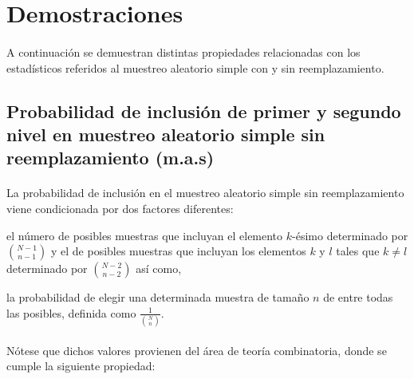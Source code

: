 \documentclass{article}
\begin{document}
	\maketitle
  \thispagestyle{empty}


  \section{Demostraciones}

    \paragraph{}
    A continuación se demuestran distintas propiedades relacionadas con los estadísticos referidos al muestreo aleatorio simple con y sin reemplazamiento.

    \subsection{Probabilidad de inclusión de primer y segundo nivel en muestreo aleatorio simple sin reemplazamiento (m.a.s)}

      \paragraph{}
      La probabilidad de inclusión en el muestreo aleatorio simple sin reemplazamiento viene condicionada por dos factores diferentes: \begin{enumerate*}[label=(\alph*)]
        \item el número de posibles muestras que incluyan el elemento $k$-ésimo determinado por $\binom{N-1}{n-1}$ y el de posibles muestras que incluyan los elementos $k$ y $l$ tales que $k \neq l$ determinado por $\binom{N-2}{n-2}$ así como,
        \item la probabilidad de elegir una determinada muestra de tamaño $n$ de entre todas las posibles, definida como $\frac{1}{\binom{N}{n}}$.
      \end{enumerate*}

      \paragraph{}
      Nótese que dichos valores provienen del área de teoría combinatoria, donde se cumple la siguiente propiedad: \cite{matematicaDiscreta2016notes}
\end{document}
